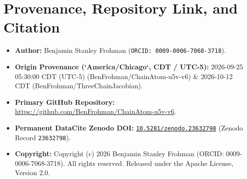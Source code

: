 \documentclass[11pt,letterpaper]{article}
\begin{document}
\section*{Provenance, Repository Link, and Citation}
\begin{itemize}[leftmargin=2em]
  \item \textbf{Author:} Benjamin Stanley Frohman (\texttt{ORCID: 0009-0006-7068-3718}).
  \item \textbf{Origin Provenance (`America/Chicago`, CDT / UTC-5):} 2026-09-25 05:30:00 CDT (UTC-5) (BenFrohman/ChainAtom-u5v-v6) \& 2026-10-12 CDT (BenFrohman/ThreeChainJacobian).
  \item \textbf{Primary GitHub Repository:} \url{https://github.com/BenFrohman/ChainAtom-u5v-v6}.
  \item \textbf{Permanent DataCite Zenodo DOI:} \href{https://doi.org/10.5281/zenodo.23632798}{\texttt{10.5281/zenodo.23632798}} (Zenodo Record \texttt{23632798}).
  \item \textbf{Copyright:} Copyright (c) 2026 Benjamin Stanley Frohman (ORCID: 0009-0006-7068-3718). All rights reserved. Released under the Apache License, Version 2.0.
\end{itemize}
\end{document}
